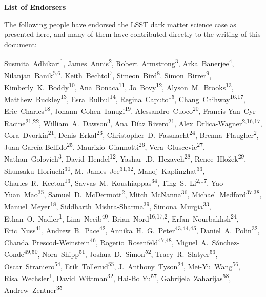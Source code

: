 
\begin{center}
  {\Large \bf List of Endorsers}
\end{center}
\bigskip

The following people have endorsed the LSST dark matter science case as presented here, and many of them have contributed directly to the writing of this document:

\def\altaffilmark#1{\textsuperscript{#1}}
\def\affil#1{\noindent #1 \\}

\normalsize
\begin{raggedright}

Susmita~Adhikari\altaffilmark{1},
James~Annis\altaffilmark{2},
Robert~Armstrong\altaffilmark{3},
Arka~Banerjee\altaffilmark{4},
Nilanjan~Banik\altaffilmark{5,6},
Keith~Bechtol\altaffilmark{7},
Simeon~Bird\altaffilmark{8},
Simon~Birrer\altaffilmark{9},
Kimberly~K.~Boddy\altaffilmark{10},
Ana~Bonaca\altaffilmark{11},
Jo~Bovy\altaffilmark{12},
Alyson~M.~Brooks\altaffilmark{13},
Matthew~Buckley\altaffilmark{13},
Esra~Bulbul\altaffilmark{14},
Regina~Caputo\altaffilmark{15},
Chang~Chihway\altaffilmark{16,17},
Eric~Charles\altaffilmark{18},
Johann~Cohen-Tanugi\altaffilmark{19},
Alessandro~Cuoco\altaffilmark{20},
Francis-Yan~Cyr-Racine\altaffilmark{21,22},
William~A.~Dawson\altaffilmark{3},
Ana~D\'{i}az Rivero\altaffilmark{21},
Alex~Drlica-Wagner\altaffilmark{2,16,17},
Cora~Dvorkin\altaffilmark{21},
Denis~Erkal\altaffilmark{23},
Christopher~D.~Fassnacht\altaffilmark{24},
Brenna~Flaugher\altaffilmark{2},
Juan Garc\'ia-Bellido\altaffilmark{25},
Maurizio~Giannotti\altaffilmark{26},
Vera~Gluscevic\altaffilmark{27},
Nathan~Golovich\altaffilmark{3},
David~Hendel\altaffilmark{12},
Yashar~.D.~Hezaveh\altaffilmark{28},
Renee~Hlo\v{z}ek\altaffilmark{29},
Shunsaku~Horiuchi\altaffilmark{30},
M.~James~Jee\altaffilmark{31,32},
Manoj~Kaplinghat\altaffilmark{33},
Charles~R.~Keeton\altaffilmark{13},
Savvas~M.~Koushiappas\altaffilmark{34},
Ting~S.~Li\altaffilmark{2,17},
Yao-Yuan~Mao\altaffilmark{35},
Samuel~D.~McDermott\altaffilmark{2},
Mitch~McNanna\altaffilmark{36},
Michael~Medford\altaffilmark{37,38},
Manuel~Meyer\altaffilmark{18},
Siddharth~Mishra-Sharma\altaffilmark{39},
Simona~Murgia\altaffilmark{33},
Ethan~O.~Nadler\altaffilmark{1},
Lina~Necib\altaffilmark{40},
Brian~Nord\altaffilmark{16,17,2},
Erfan~Nourbakhsh\altaffilmark{24},
Eric~Nuss\altaffilmark{41},
Andrew~B.~Pace\altaffilmark{42},
Annika~H.~G.~Peter\altaffilmark{43,44,45},
Daniel~A.~Polin\altaffilmark{32},
Chanda~Prescod-Weinstein\altaffilmark{46},
Rogerio~Rosenfeld\altaffilmark{47,48},
Miguel~A.~S\'anchez-Conde\altaffilmark{49,50},
Nora~Shipp\altaffilmark{51},
Joshua~D.~Simon\altaffilmark{52},
Tracy~R.~Slatyer\altaffilmark{53},
Oscar~Straniero\altaffilmark{54},
Erik~Tollerud\altaffilmark{55},
J.~Anthony~Tyson\altaffilmark{24},
Mei-Yu~Wang\altaffilmark{56},
Risa~Wechsler\altaffilmark{1},
David~Wittman\altaffilmark{32},
Hai-Bo Yu\altaffilmark{57},
Gabrijela~Zaharijas\altaffilmark{58},
Andrew~Zentner\altaffilmark{35}


\end{raggedright}

